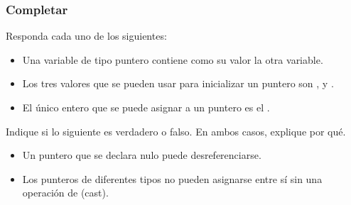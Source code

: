 %
%
%
%
%
%    


\subsubsection{Completar}
Responda cada uno de los siguientes:
\begin{itemize}[a)]
\item Una variable de tipo puntero contiene como su valor la \underspace otra variable.
\item Los tres valores que se pueden usar para inicializar un puntero son \underspace, \underspace y \underspace.
\item El único entero que se puede asignar a un puntero es el \underspace.
\end{itemize}

Indique si lo siguiente es verdadero o falso. En ambos casos, explique por qué.
\begin{itemize}[a)]
\item Un puntero que se declara nulo puede desreferenciarse.
\item Los punteros de diferentes tipos no pueden asignarse entre sí sin una operación de (cast).
\end{itemize}


